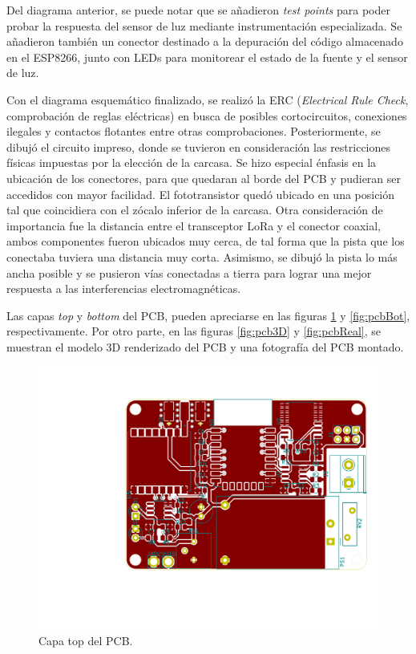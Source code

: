 Del diagrama anterior, se puede notar que se añadieron \textit{test points} para poder probar la respuesta del sensor de luz mediante instrumentación especializada. Se añadieron también un conector destinado a la depuración del código almacenado en el ESP8266, junto con LEDs para monitorear el estado de la fuente y el sensor de luz.

Con el diagrama esquemático finalizado, se realizó la ERC (\textit{Electrical Rule Check}, comprobación de reglas eléctricas) en busca de posibles cortocircuitos, conexiones ilegales y contactos flotantes entre otras comprobaciones. Posteriormente, se dibujó el circuito impreso, donde se tuvieron en consideración las restricciones físicas impuestas por la elección de la carcasa. Se hizo especial énfasis en la ubicación de los conectores, para que quedaran al borde del PCB y pudieran ser accedidos con mayor facilidad. El fototransistor quedó ubicado en una posición tal que coincidiera con el zócalo inferior de la carcasa. Otra consideración de importancia fue la distancia entre el transceptor LoRa y el conector coaxial, ambos componentes fueron ubicados muy cerca, de tal forma que la pista que los conectaba tuviera una distancia muy corta. Asimismo, se dibujó la pista lo más ancha posible y se pusieron vías conectadas a tierra para lograr una mejor respuesta a las interferencias electromagnéticas.

Las capas \textit{top} y \textit{bottom} del PCB, pueden apreciarse en las figuras \ref{fig:pcbTop} y \ref{fig:pcbBot}, respectivamente. Por otro parte, en las figuras \ref{fig:pcb3D} y \ref{fig:pcbReal}, se muestran el modelo 3D renderizado del PCB y una fotografía del PCB montado.

\begin{figure}[h]
	\centering
	\includegraphics[scale=0.5]{./Figures/pcb_top.pdf}
	\caption{Capa top del PCB.}
		\label{fig:pcbTop}
\end{figure}

